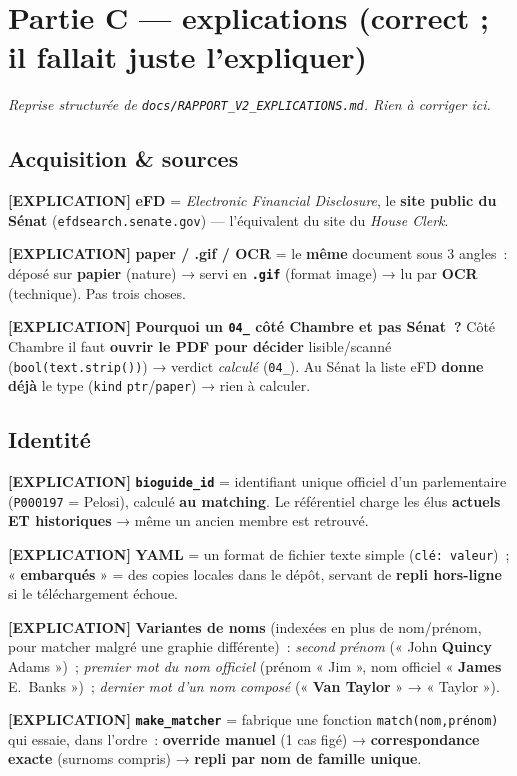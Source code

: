 \documentclass[11pt,a4paper]{article}
\newcommand{\co}[1]{\texttt{\small #1}}
\newcommand{\tagExp}{\textcolor{green!50!black}{\textbf{[EXPLICATION]}}}
\begin{document}
\section{Partie C — explications (correct ; il fallait juste l'expliquer)}
\textit{Reprise structurée de \co{docs/RAPPORT_V2_EXPLICATIONS.md}. Rien à corriger ici.}

\subsection{Acquisition \& sources}
\tagExp{} \textbf{eFD} = \emph{Electronic Financial Disclosure}, le \textbf{site public du Sénat}
(\co{efdsearch.senate.gov}) — l'équivalent du site du \emph{House Clerk}.

\tagExp{} \textbf{paper / .gif / OCR} = le \textbf{même} document sous 3 angles~: déposé sur
\textbf{papier} (nature) → servi en \textbf{\co{.gif}} (format image) → lu par \textbf{OCR} (technique).
Pas trois choses.

\tagExp{} \textbf{Pourquoi un \co{04_} côté Chambre et pas Sénat~?} Côté Chambre il faut \textbf{ouvrir
le PDF pour décider} lisible/scanné (\co{bool(text.strip())}) → verdict \emph{calculé} (\co{04_}). Au
Sénat la liste eFD \textbf{donne déjà} le type (\co{kind} \co{ptr}/\co{paper}) → rien à calculer.

\subsection{Identité}
\tagExp{} \textbf{\co{bioguide_id}} = identifiant unique officiel d'un parlementaire (\co{P000197} =
Pelosi), calculé \textbf{au matching}. Le référentiel charge les élus \textbf{actuels ET historiques}
→ même un ancien membre est retrouvé.

\tagExp{} \textbf{YAML} = un format de fichier texte simple (\co{clé: valeur})~; « \textbf{embarqués} » =
des copies locales dans le dépôt, servant de \textbf{repli hors-ligne} si le téléchargement échoue.

\tagExp{} \textbf{Variantes de noms} (indexées en plus de nom/prénom, pour matcher malgré une graphie
différente)~: \emph{second prénom} (« John \textbf{Quincy} Adams »)~; \emph{premier mot du nom officiel}
(prénom « Jim », nom officiel « \textbf{James} E.~Banks »)~; \emph{dernier mot d'un nom composé}
(« \textbf{Van Taylor} » → « Taylor »).

\tagExp{} \textbf{\co{make_matcher}} = fabrique une fonction \co{match(nom,prénom)} qui essaie, dans
l'ordre~: \textbf{override manuel} (1 cas figé) → \textbf{correspondance exacte} (surnoms compris) →
\textbf{repli par nom de famille unique}.
\end{document}
